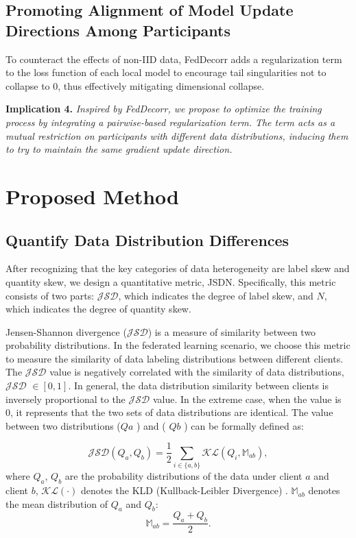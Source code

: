 \documentclass[journal,twoside,web]{ieeecolor}
\begin{document}
\subsection{Promoting Alignment of Model Update Directions Among Participants}

To counteract the effects of non-IID data, FedDecorr\cite{pami} adds a regularization term to the loss function of each local model to encourage tail singularities not to collapse to 0, thus effectively mitigating dimensional collapse.

\noindent \textbf{Implication 4.}  \textit{Inspired by FedDecorr, we propose to optimize the training process by integrating a pairwise-based regularization term. The term acts as a mutual restriction on participants with different data distributions, inducing them to try to maintain the same gradient update direction.}




\section{Proposed Method}
\subsection{Quantify Data Distribution Differences}
After recognizing that the key categories of data heterogeneity are label skew and quantity skew, we design a quantitative metric, JSDN. Specifically, this metric consists of two parts: $\mathcal{JSD}$, which indicates the degree of label skew, and $N$, which indicates the degree of quantity skew.

Jensen-Shannon divergence ($\mathcal{JSD}$) is a measure of similarity between two probability distributions\cite{jsd}. In the federated learning scenario, we choose this metric to measure the similarity of data labeling distributions between different clients. The $\mathcal{JSD}$ value is negatively correlated with the similarity of data distributions, $\mathcal{JSD}$ $\in [0, 1]$. 
In general, the data distribution similarity between clients is inversely proportional to the $\mathcal{JSD}$ value.
In the extreme case, when the  value is 0, it represents that the two sets of data distributions are identical.
The value between two distributions ($ Qa $ ) and ( $Qb$ ) can be formally defined as:

\begin{equation}
\mathcal{JSD}(Q_a,Q_b) = \frac{1}{2} \sum_{i \in \{a, b\}} \mathcal{KL}(Q_i, \mathbb{M}_{ab}),
\end{equation}
where $Q_a$, $Q_b$ are the probability distributions of the data under client $a$ and client $b$, $\mathcal{KL}(\cdot)$ denotes the KLD (Kullback-Leibler Divergence) \cite{kl}. $\mathbb{M}_{ab}$ denotes the mean distribution of $Q_a$ and $Q_b$:
\begin{equation}
\mathbb{M}_{ab} = \frac{Q_a + Q_b}{2}.
\end{equation}
\end{document}

